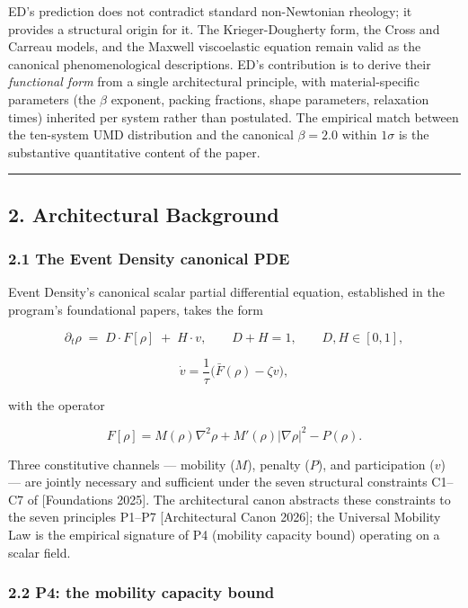 \documentclass[
  11pt,a4paper]{article}
\begin{document}
ED's prediction does not contradict standard non-Newtonian rheology; it
provides a structural origin for it. The Krieger-Dougherty form, the
Cross and Carreau models, and the Maxwell viscoelastic equation remain
valid as the canonical phenomenological descriptions. ED's contribution
is to derive their \emph{functional form} from a single architectural
principle, with material-specific parameters (the \(\beta\) exponent,
packing fractions, shape parameters, relaxation times) inherited per
system rather than postulated. The empirical match between the
ten-system UMD distribution and the canonical \(\beta = 2.0\) within
\(1\sigma\) is the substantive quantitative content of the paper.

\begin{center}\rule{0.5\linewidth}{0.5pt}\end{center}

\subsection{2. Architectural Background}\label{architectural-background}

\subsubsection{2.1 The Event Density canonical
PDE}\label{the-event-density-canonical-pde}

Event Density's canonical scalar partial differential equation,
established in the program's foundational papers, takes the form

\[\partial_t \rho \;=\; D \cdot F[\rho] \;+\; H \cdot v, \qquad D + H = 1, \qquad D, H \in [0, 1],\]

\[\dot v = \frac{1}{\tau}\bigl(\bar F(\rho) - \zeta v\bigr),\]

with the operator

\[F[\rho] = M(\rho) \nabla^2 \rho + M'(\rho) |\nabla\rho|^2 - P(\rho).\]

Three constitutive channels --- mobility (\(M\)), penalty (\(P\)), and
participation (\(v\)) --- are jointly necessary and sufficient under the
seven structural constraints C1--C7 of {[}Foundations 2025{]}. The
architectural canon abstracts these constraints to the seven principles
P1--P7 {[}Architectural Canon 2026{]}; the Universal Mobility Law is the
empirical signature of P4 (mobility capacity bound) operating on a
scalar field.

\subsubsection{2.2 P4: the mobility capacity
bound}\label{p4-the-mobility-capacity-bound}
\end{document}
